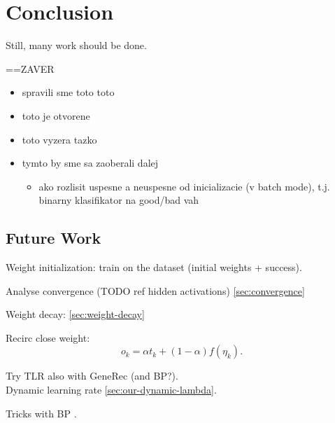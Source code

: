\section*{Conclusion}
\label{sec:conclusion} 

Still, many work should be done. 


==ZAVER 
\begin{itemize} 
\item   spravili sme toto toto
\item   toto je otvorene
\item   toto vyzera tazko
\item   tymto by sme sa zaoberali dalej 
\begin{itemize}
\item ako rozlisit uspesne a neuspesne od inicializacie (v batch mode), t.j. binarny klasifikator na good/bad vah 
\end{itemize} 

\end{itemize} 


\subsection*{Future Work} 
Weight initialization: train on the dataset (initial weights + success). 

Analyse convergence 
(TODO ref hidden activations) \ref{sec:convergence} 

Weight decay: 
\ref{sec:weight-decay} 

Recirc close weight: 
\begin{equation}
o_k = \alpha t_k + (1-\alpha)f(\eta_k). 
\end{equation} 

Try TLR also with GeneRec (and BP?).  \\ 

\label{sec:future-dlr} 
Dynamic learning rate \ref{sec:our-dynamic-lambda}. 

Tricks with BP \citep{lecun2012efficient}. 



